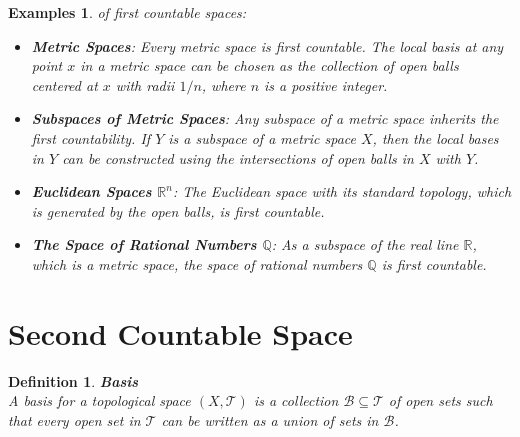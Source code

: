 \documentclass[11pt]{book} %
\newtheorem{definition}{Definition}[section]
\newtheorem*{examples*}{Examples}
\begin{document}
\begin{examples*} of first countable spaces:
    \begin{itemize}
        \item \textbf{Metric Spaces}: Every metric space is first countable. 
        The local basis at any point \( x \) in a metric space can be chosen as the collection of open balls centered 
        at \( x \) with radii \( 1/n \), where \( n \) is a positive integer.

        \item \textbf{Subspaces of Metric Spaces}: Any subspace of a metric space inherits the first countability. 
        If \( Y \) is a subspace of a metric space \( X \), then the local bases in \( Y \) can be constructed using 
        the intersections of open balls in \( X \) with \( Y \).

        \item \textbf{Euclidean Spaces \( \mathbb{R}^n \)}: The Euclidean space with its standard topology, 
        which is generated by the open balls, is first countable.

        \item \textbf{The Space of Rational Numbers \( \mathbb{Q} \)}: As a subspace of the real line \( \mathbb{R} \), 
        which is a metric space, the space of rational numbers \( \mathbb{Q} \) is first countable.
    \end{itemize}
\end{examples*}

\section{Second Countable Space}

\begin{definition}{\textbf{Basis}} \\
    A basis for a topological space \( (X, \mathcal{T}) \) is a collection \( \mathcal{B} \subseteq \mathcal{T} \) of open sets 
    such that every open set in \( \mathcal{T} \) can be written as a union of sets in \( \mathcal{B} \).
\end{definition}
\end{document}
